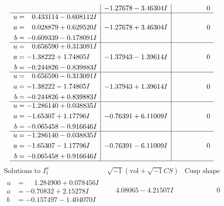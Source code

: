 \documentclass[1p]{elsarticle_modified}
\theoremstyle{definition}
\newcommand{\I}{\sqrt{-1}}
\begin{document}
$$\begin{array}{c|c|c}
 & -1.27678 - 3.46304 I & \phantom{-0.000000 } 0 \\ \hline\begin{aligned}
u &= \phantom{-}0.433114 - 0.608112 I \\
a &= \phantom{-}0.028879 + 0.629520 I \\
b &= -0.609339 - 0.178091 I\end{aligned}
 & -1.27678 + 3.46304 I & \phantom{-0.000000 } 0 \\ \hline\begin{aligned}
u &= \phantom{-}0.656590 + 0.313091 I \\
a &= -1.38222 + 1.74805 I \\
b &= -0.244826 - 0.839883 I\end{aligned}
 & -1.37943 - 1.39614 I & \phantom{-0.000000 } 0 \\ \hline\begin{aligned}
u &= \phantom{-}0.656590 - 0.313091 I \\
a &= -1.38222 - 1.74805 I \\
b &= -0.244826 + 0.839883 I\end{aligned}
 & -1.37943 + 1.39614 I & \phantom{-0.000000 } 0 \\ \hline\begin{aligned}
u &= -1.286140 + 0.038835 I \\
a &= -1.65307 + 1.17796 I \\
b &= -0.065458 - 0.916646 I\end{aligned}
 & -0.76391 + 6.11009 I & \phantom{-0.000000 } 0 \\ \hline\begin{aligned}
u &= -1.286140 - 0.038835 I \\
a &= -1.65307 - 1.17796 I \\
b &= -0.065458 + 0.916646 I\end{aligned}
 & -0.76391 - 6.11009 I & \phantom{-0.000000 } 0\\
 \hline 
 \end{array}$$\newpage$$\begin{array}{c|c|c}  
\text{Solutions to }I^u_{1}& \I (\text{vol} + \sqrt{-1}CS) & \text{Cusp shape}\\
 \hline 
\begin{aligned}
u &= \phantom{-}1.284900 + 0.078456 I \\
a &= -0.70832 + 2.15278 I \\
b &= -0.157497 - 1.404070 I\end{aligned}
 & \phantom{-}4.08065 - 4.21507 I & \phantom{-0.000000 } 0 \\ \hline\begin{aligned}

\end{aligned}
\end{array}$$
\end{document}

